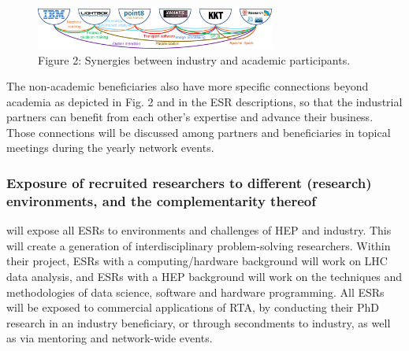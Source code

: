 \begin{figure}
	\includegraphics[width=0.7\textwidth]{figs/SMARTHEP_InteractionIndustryAcademia} %
	\caption*{Figure 2: Synergies between industry and academic participants.\label{fig:synergies}}
\end{figure}
The non-academic beneficiaries also have more specific connections beyond academia as depicted in Fig. 2 and in the ESR descriptions, so that the industrial partners can benefit from each other's expertise and advance their business. Those connections will be discussed among partners and beneficiaries in topical meetings during the yearly network events. 


\vspace{-2mm}
\subsubsection{Exposure of recruited researchers to different (research) environments, and the complementarity thereof}
\label{sec:exposureComplementarity}

\acronym will expose all ESRs to environments and challenges of HEP and industry. This will create a generation of interdisciplinary problem-solving researchers.
Within their project, ESRs with a computing/hardware background will work on LHC data analysis, and ESRs with a HEP background will work on the techniques and methodologies of data science, software and hardware programming.
All ESRs will be exposed to commercial applications of RTA, by conducting their PhD research in an industry beneficiary, or through secondments to industry, as well as via mentoring and network-wide events. 

